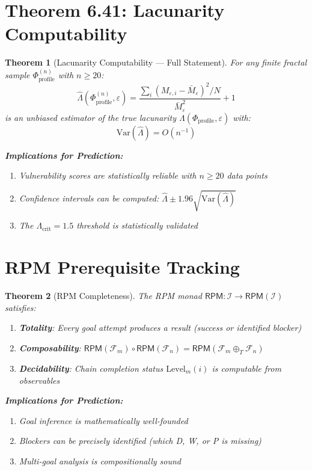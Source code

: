 \documentclass[11pt,twoside]{book}
\newcommand{\Ideas}{\mathcal{I}}
\newcommand{\Foundations}{\mathcal{F}}
\newcommand{\RPM}{\mathsf{RPM}}
\newcommand{\Tadd}{\oplus_T}
\newcommand{\Lacunarity}{\Lambda}
\newcommand{\ProfileFrac}{\Phi_{\mathrm{profile}}}
\newtheorem{theorem}{Theorem}[chapter]
\begin{document}
\section{Theorem 6.41: Lacunarity Computability}

\begin{theorem}[Lacunarity Computability --- Full Statement]
\label{thm:lacunarity-full}
For any finite fractal sample $\ProfileFrac^{(n)}$ with $n \geq 20$:
\[
    \hat{\Lacunarity}(\ProfileFrac^{(n)}, \varepsilon) = \frac{\sum_{i}(M_{\varepsilon,i} - \bar{M}_\varepsilon)^2 / N}{\bar{M}_\varepsilon^2} + 1
\]
is an unbiased estimator of the true lacunarity $\Lacunarity(\ProfileFrac, \varepsilon)$ with:
\[
    \mathrm{Var}(\hat{\Lacunarity}) = O(n^{-1})
\]

\textbf{Implications for Prediction:}
\begin{enumerate}
    \item Vulnerability scores are statistically reliable with $n \geq 20$ data points
    \item Confidence intervals can be computed: $\hat{\Lacunarity} \pm 1.96 \sqrt{\mathrm{Var}(\hat{\Lacunarity})}$
    \item The $\Lacunarity_{\mathrm{crit}} = 1.5$ threshold is statistically validated
\end{enumerate}
\end{theorem}

\section{RPM Prerequisite Tracking}

\begin{theorem}[RPM Completeness]
\label{thm:rpm-complete}
The RPM monad $\RPM : \Ideas \to \RPM(\Ideas)$ satisfies:
\begin{enumerate}[label=(\roman*)]
    \item \textbf{Totality}: Every goal attempt produces a result (success or identified blocker)
    \item \textbf{Composability}: $\RPM(\Foundations_m) \circ \RPM(\Foundations_n) = \RPM(\Foundations_m \Tadd \Foundations_n)$
    \item \textbf{Decidability}: Chain completion status $\mathrm{Level}_m(i)$ is computable from observables
\end{enumerate}

\textbf{Implications for Prediction:}
\begin{enumerate}
    \item Goal inference is mathematically well-founded
    \item Blockers can be precisely identified (which D, W, or P is missing)
    \item Multi-goal analysis is compositionally sound
\end{enumerate}
\end{theorem}
\end{document}

